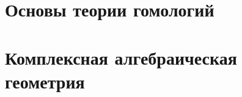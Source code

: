 \documentclass[dvipsnames, 11pt]{article}
\begin{document}
        
    
    \newpage

    \section{Основы теории гомологий}

    
    
    
    
    
    
    
    

    \newpage
    \section{Комплексная алгебраическая геометрия}
    
    
    

    
\end{document}
